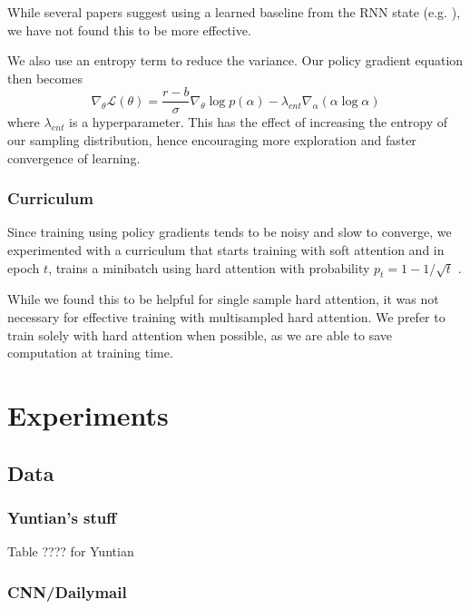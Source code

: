 \documentclass[11pt]{report}
\begin{document}
While several papers suggest using a learned baseline from the RNN state (e.g. \cite{ranzato2015}), we have not found this to be more effective.

We also use an entropy term to reduce the variance. Our policy gradient equation then becomes
\begin{equation}
\label{policygradbaselineentropy}
\nabla_\theta \mathcal{L}(\theta) = \frac{r-b}{\sigma} \nabla_\theta \log p(\alpha) - \lambda_{ent} \nabla_\alpha(\alpha \log \alpha)
\end{equation}
where $\lambda_{ent}$ is a hyperparameter. This has the effect of increasing the entropy of our sampling distribution, hence encouraging more exploration and faster convergence of learning.

\subsection{Curriculum}

Since training using policy gradients tends to be noisy and slow to converge, we experimented with a curriculum that starts training with soft attention and in epoch $t$, trains a minibatch using hard attention with probability $p_t = 1 - 1/\sqrt{t}$ \citep{bengio2016hardntm}.

While we found this to be helpful for single sample hard attention, it was not necessary for effective training with multisampled hard attention. We prefer to train solely with hard attention when possible, as we are able to save computation at training time.


\chapter{Experiments}

\section{Data}

\subsection{Yuntian's stuff}


Table ???? for Yuntian

\subsection{CNN/Dailymail}
\end{document}
